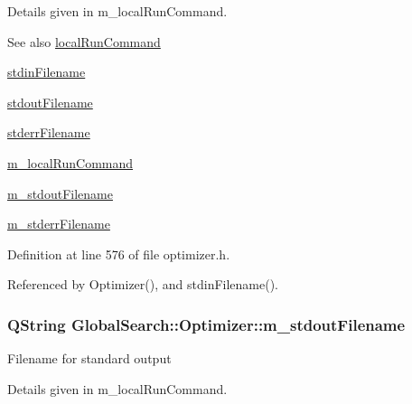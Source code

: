 Details given in m\+\_\+local\+Run\+Command.

\begin{DoxySeeAlso}{See also}
\hyperlink{classGlobalSearch_1_1Optimizer_aed5eb285d45a001c9520c2ed3a5b57a1}{local\+Run\+Command} 

\hyperlink{classGlobalSearch_1_1Optimizer_a5964a9b38d3ae90c8ac36a75d3a35832}{stdin\+Filename} 

\hyperlink{classGlobalSearch_1_1Optimizer_a217750aa50431f9948aa8164fb99de0c}{stdout\+Filename} 

\hyperlink{classGlobalSearch_1_1Optimizer_acaa83cc6bf1dcc263b92450b4f8cb652}{stderr\+Filename} 

\hyperlink{classGlobalSearch_1_1Optimizer_a1cdb6b6c5e929e84c834ba93148fb31e}{m\+\_\+local\+Run\+Command} 

\hyperlink{classGlobalSearch_1_1Optimizer_a5ed04fdd5f8b511249e408adcd174550}{m\+\_\+stdout\+Filename} 

\hyperlink{classGlobalSearch_1_1Optimizer_a75b800a7f90a03d551f6795404d0c8f1}{m\+\_\+stderr\+Filename} 
\end{DoxySeeAlso}


Definition at line 576 of file optimizer.\+h.



Referenced by Optimizer(), and stdin\+Filename().

\hypertarget{classGlobalSearch_1_1Optimizer_a5ed04fdd5f8b511249e408adcd174550}{}
\subsubsection[{m\+\_\+stdout\+Filename}]{\setlength{\rightskip}{0pt plus 5cm}Q\+String Global\+Search\+::\+Optimizer\+::m\+\_\+stdout\+Filename\hspace{0.3cm}{\ttfamily [protected]}}\label{classGlobalSearch_1_1Optimizer_a5ed04fdd5f8b511249e408adcd174550}
Filename for standard output

Details given in m\+\_\+local\+Run\+Command.

